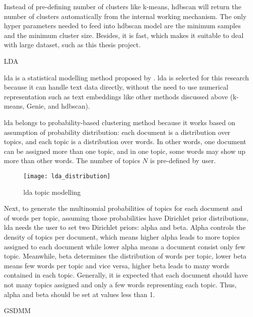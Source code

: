 \documentclass[a4paper,man,floatsintext,natbib,noextraspace]{apa6}
\makeatletter
\renewcommand{\subsubsection}{\@startsection{subsubsection}{3}
  {\z@}
  {\b@level@two@skip}
  {\e@level@two@skip}
  {\normalfont\normalsize\bfseries\itshape}}
\makeatother
\begin{document}
Instead of pre-defining number of clusters like k-means, \gls{hdbscan} will return the number of clusters automatically from the internal working mechanism. The only hyper parameters needed to feed into \gls{hdbscan} model are the minimum samples and the minimum cluster size. Besides, it is fast, which makes it suitable to deal with large dataset, such as this thesis project.

\subsubsection{LDA}

\gls{lda} is a statistical modelling method proposed by \cite{blei2003latent}. 
\gls{lda} is selected for this research because it can handle text data directly, without the need to use numerical representation such as text embeddings like other methods discussed above (k-means, Genie, and \gls{hdbscan}). 

\gls{lda} belongs to probability-based clustering method because it works based on assumption of probability distribution: each document is a distribution over topics, and
each topic is a distribution over words. In other words, one document can be assigned more than one topic, and in one topic, some words may show up more than other words. The number of topics $N$ is pre-defined by user.

\begin{figure}[h!]
    \centering
    \captionsetup{justification=centering}
    \texttt{[image: lda\_distribution]}
    \caption{\gls{lda} topic modelling}\label{fig:lda_distribution}
\end{figure}  

Next, to generate the multinomial probabilities of topics for each document and of words per topic, assuming those probabilities have Dirichlet prior distributions, \gls{lda} needs the user to set two Dirichlet priors: alpha and beta. Alpha controls the density of topics per document, which means higher alpha leads to more topics assigned to each document while lower alpha means a document consist only few topic. Meanwhile, beta determines the distribution of words per topic, lower beta means few words per topic and vice versa, higher beta leads to many words contained in each topic. Generally, it is expected that each document should have not many topics assigned and only a few words representing each topic. Thus, alpha and beta should be set at values less than 1. 

\subsubsection{GSDMM}
\end{document}
